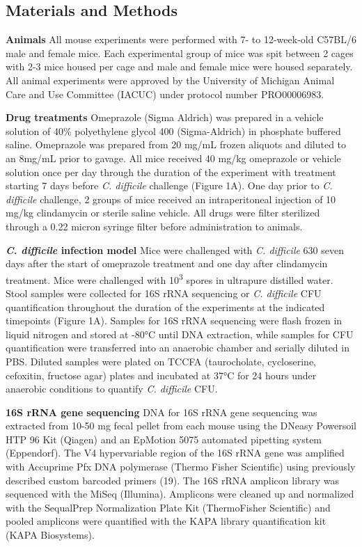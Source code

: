 \documentclass[11pt,]{article}
\begin{document}
\newpage

\subsection{Materials and Methods}\label{materials-and-methods}

\textbf{Animals} All mouse experiments were performed with 7- to
12-week-old C57BL/6 male and female mice. Each experimental group of
mice was spit between 2 cages with 2-3 mice housed per cage and male and
female mice were housed separately. All animal experiments were approved
by the University of Michigan Animal Care and Use Committee (IACUC)
under protocol number PRO00006983.

\textbf{Drug treatments} Omeprazole (Sigma Aldrich) was prepared in a
vehicle solution of 40\% polyethylene glycol 400 (Sigma-Aldrich) in
phosphate buffered saline. Omeprazole was prepared from 20 mg/mL frozen
aliquots and diluted to an 8mg/mL prior to gavage. All mice received 40
mg/kg omeprazole or vehicle solution once per day through the duration
of the experiment with treatment starting 7 days before \emph{C.
difficile} challenge (Figure 1A). One day prior to \emph{C. difficile}
challenge, 2 groups of mice received an intraperitoneal injection of 10
mg/kg clindamycin or sterile saline vehicle. All drugs were filter
sterilized through a 0.22 micron syringe filter before administration to
animals.

\textbf{\emph{C. difficile} infection model} Mice were challenged with
\emph{C. difficile} 630 seven days after the start of omeprazole
treatment and one day after clindamycin treatment. Mice were challenged
with 10\textsuperscript{3} spores in ultrapure distilled water. Stool
samples were collected for 16S rRNA sequencing or \emph{C. difficile}
CFU quantification throughout the duration of the experiments at the
indicated timepoints (Figure 1A). Samples for 16S rRNA sequencing were
flash frozen in liquid nitrogen and stored at -80°C until DNA
extraction, while samples for CFU quantification were transferred into
an anaerobic chamber and serially diluted in PBS. Diluted samples were
plated on TCCFA (taurocholate, cycloserine, cefoxitin, fructose agar)
plates and incubated at 37°C for 24 hours under anaerobic conditions to
quantify \emph{C. difficile} CFU.

\textbf{16S rRNA gene sequencing} DNA for 16S rRNA gene sequencing was
extracted from 10-50 mg fecal pellet from each mouse using the DNeasy
Powersoil HTP 96 Kit (Qiagen) and an EpMotion 5075 automated pipetting
system (Eppendorf). The V4 hypervariable region of the 16S rRNA gene was
amplified with Accuprime Pfx DNA polymerase (Thermo Fisher Scientific)
using previously described custom barcoded primers (19). The 16S rRNA
amplicon library was sequenced with the MiSeq (Illumina). Amplicons were
cleaned up and normalized with the SequalPrep Normalization Plate Kit
(ThermoFisher Scientific) and pooled amplicons were quantified with the
KAPA library quantification kit (KAPA Biosystems).
\end{document}
